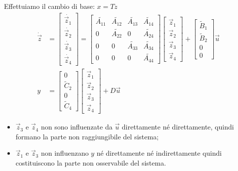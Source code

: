 \documentclass[../main.tex]{subfiles}
\begin{document}
		Effettuiamo il cambio di base: $ x = Tz $
		\begin{align*}
			\dot{\vec z} &=
			\begin{bmatrix}
				\dot{\vec z_1}\\
				\dot{\vec z_2}\\
				\dot{\vec z_3}\\
				\dot{\vec z_4}
			\end{bmatrix} =
			\begin{bmatrix}
				\tilde{A_{11}} & \tilde{A_{12}} & \tilde{A_{13}} & \tilde{A_{14}}\\
				0 & \tilde{A_{22}} & 0 & \tilde{A_{24}}\\
				0 & 0 & \tilde{A_{33}} & \tilde{A_{34}}\\
				0 & 0 & 0 & \tilde{A_{44}}
			\end{bmatrix}
			\begin{bmatrix}
				\vec z_1\\
				\vec z_2\\
				\vec z_3\\
				\vec z_4
			\end{bmatrix} +
			\begin{bmatrix}
				\tilde B_1\\
				\tilde B_2\\
				0\\
				0
			\end{bmatrix} \vec u
			\\
			y &=
			\begin{bmatrix}
				0\\
				\tilde C_2\\
				0\\
				\tilde C_4
			\end{bmatrix}
			\begin{bmatrix}
				\vec z_1\\
				\vec z_2\\
				\vec z_3\\
				\vec z_4
			\end{bmatrix} + D \vec u
		\end{align*}
		\begin{itemize}
			\item 
				$ \vec z_3 $ e $ \vec z_4 $ non sono influenzate da $ \vec u $ direttamente n\'e direttamente, quindi formano la parte non raggiungibile del sistema;
			\item 
				$ \vec z_1 $ e $ \vec z_3 $ non influenzano $ y $ n\'e direttamente n\'e indirettamente quindi costituiscono la parte non osservabile del sistema.
		\end{itemize}
	
\end{document}
